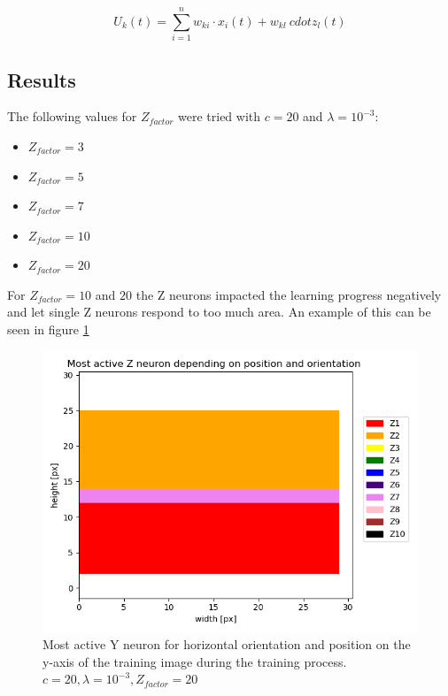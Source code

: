 \begin{equation}
\label{eqn:ukHorvert}
U_k(t) = \sum_{i=1}^n w_{ki} \cdot x_i(t) + w_{kl} \ cdot z_l(t)
\end{equation}

\subsection{Results} 

The following values for $Z_{factor} $ were tried with $c = 20$ and $\lambda = 10^{-3}$:
\begin{itemize}
  \item $Z_{factor} = 3$
  \item $Z_{factor} = 5$
  \item $Z_{factor} = 7$  
  \item $Z_{factor} = 10$ 
  \item $Z_{factor} = 20$
\end{itemize}

For $Z_{factor} = 10$ and $20$ the Z neurons impacted the learning progress negatively and let single Z neurons respond to too much area. An example of this can be seen in figure \ref{fig:horvert_c20_3_Zfactor20_horizontalLines}

\begin{figure}
  \includegraphics[width=\linewidth]{figures/horvert/horvert_c20_3_Zfactor20_horizontalLines.png}
  \caption{Most active Y neuron for horizontal orientation and position on the y-axis of the training image during the training process. $c = 20, \lambda = 10^{-3}, Z_{factor} = 20$}
  \label{fig:horvert_c20_3_Zfactor20_horizontalLines}
\end{figure}


